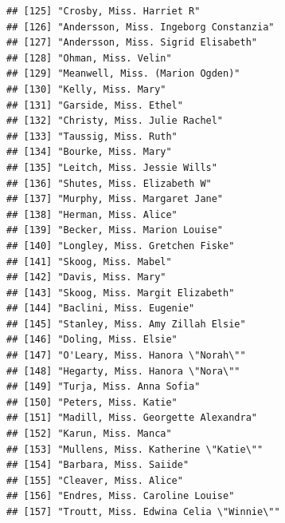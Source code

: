 \documentclass[11pt,]{book}
\begin{document}
\begin{verbatim}
## [125] "Crosby, Miss. Harriet R"                                              
## [126] "Andersson, Miss. Ingeborg Constanzia"                                 
## [127] "Andersson, Miss. Sigrid Elisabeth"                                    
## [128] "Ohman, Miss. Velin"                                                   
## [129] "Meanwell, Miss. (Marion Ogden)"                                       
## [130] "Kelly, Miss. Mary"                                                    
## [131] "Garside, Miss. Ethel"                                                 
## [132] "Christy, Miss. Julie Rachel"                                          
## [133] "Taussig, Miss. Ruth"                                                  
## [134] "Bourke, Miss. Mary"                                                   
## [135] "Leitch, Miss. Jessie Wills"                                           
## [136] "Shutes, Miss. Elizabeth W"                                            
## [137] "Murphy, Miss. Margaret Jane"                                          
## [138] "Herman, Miss. Alice"                                                  
## [139] "Becker, Miss. Marion Louise"                                          
## [140] "Longley, Miss. Gretchen Fiske"                                        
## [141] "Skoog, Miss. Mabel"                                                   
## [142] "Davis, Miss. Mary"                                                    
## [143] "Skoog, Miss. Margit Elizabeth"                                        
## [144] "Baclini, Miss. Eugenie"                                               
## [145] "Stanley, Miss. Amy Zillah Elsie"                                      
## [146] "Doling, Miss. Elsie"                                                  
## [147] "O'Leary, Miss. Hanora \"Norah\""                                      
## [148] "Hegarty, Miss. Hanora \"Nora\""                                       
## [149] "Turja, Miss. Anna Sofia"                                              
## [150] "Peters, Miss. Katie"                                                  
## [151] "Madill, Miss. Georgette Alexandra"                                    
## [152] "Karun, Miss. Manca"                                                   
## [153] "Mullens, Miss. Katherine \"Katie\""                                   
## [154] "Barbara, Miss. Saiide"                                                
## [155] "Cleaver, Miss. Alice"                                                 
## [156] "Endres, Miss. Caroline Louise"                                        
## [157] "Troutt, Miss. Edwina Celia \"Winnie\""                                

\end{verbatim}
\end{document}
